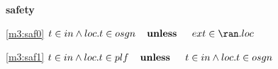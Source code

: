 \textbf{safety}
\begin{block}
\item[ \eqref{m3:saf0} ]{$t \in in \land loc.t \in osgn  \textbf{\quad unless \quad} ext \in \ran. loc $} %
\item[ \eqref{m3:saf1} ]{$t \in in \land loc.t \in plf  \textbf{\quad unless \quad} t \in in \land loc.t \in osgn $} %
\end{block}
